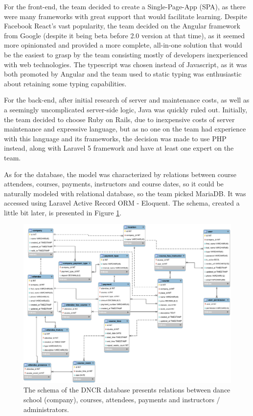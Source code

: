 \documentclass{article}
\begin{document}
For the front-end, the team decided to create a Single-Page-App (SPA), as there were many frameworks with great support that would facilitate learning. Despite Facebook React's vast popularity, the team decided on the Angular framework from Google (despite it being beta before 2.0 version at that time), as it seemed more opinionated and provided a more complete, all-in-one solution that would be the easiest to grasp by the team consisting mostly of developers inexperienced with web technologies. The typescript was chosen instead of Javascript, as it was both promoted by Angular and the team used to static typing was enthusiastic about retaining some typing capabilities.

For the back-end, after initial research of server and maintenance costs, as well as a seemingly uncomplicated server-side logic, Java was quickly ruled out. Initially, the team decided to choose Ruby on Rails, due to inexpensive costs of server maintenance and expressive language, but as no one on the team had experience with this language and its frameworks, the decision was made to use PHP instead, along with Laravel 5 framework and have at least one expert on the team.

As for the database, the model was characterized by relations between course attendees, courses, payments, instructors and course dates, so it could be naturally modeled with relational database, so the team picked MariaDB. It was accessed using Laravel Active Record ORM - Eloquent. The schema, created a little bit later, is presented in Figure \ref{fig:schema}.

\begin{figure}[h]
    \includegraphics[width=\textwidth]{schema}
    \caption{The schema of the DNCR database presents relations between dance school (company), courses, attendees, payments and instructors / administrators.}
    \label{fig:schema} 
\end{figure}
\end{document}
